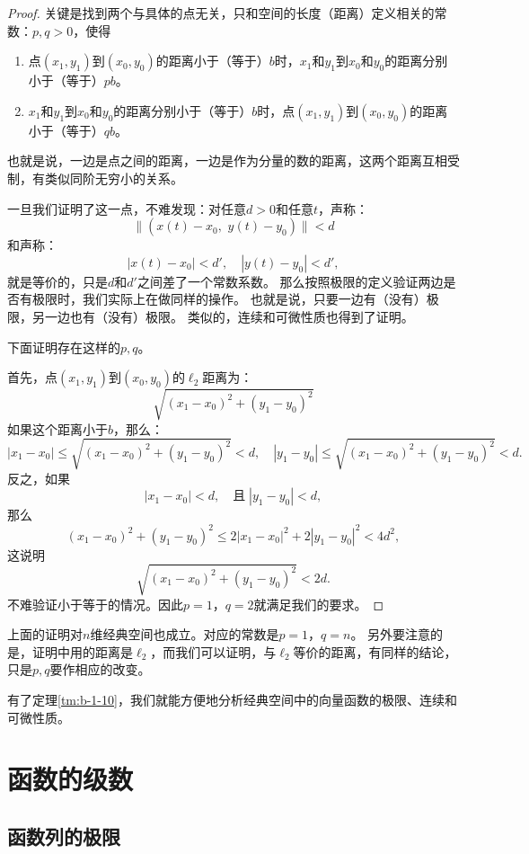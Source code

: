 \documentclass[12pt,UTF8]{ctexbook}
\begin{document}
\begin{appendix}
\begin{proof}
    关键是找到两个与具体的点无关，只和空间的长度（距离）定义相关的常数：$p,q>0$，使得
    \begin{enumerate}
        \item 点$(x_1, y_1)$到$(x_0, y_0)$的距离小于（等于）$b$时，$x_1$和$y_1$到$x_0$和$y_0$的距离分别小于（等于）$pb$。
        \item $x_1$和$y_1$到$x_0$和$y_0$的距离分别小于（等于）$b$时，点$(x_1, y_1)$到$(x_0, y_0)$的距离小于（等于）$qb$。
    \end{enumerate}
    也就是说，一边是点之间的距离，一边是作为分量的数的距离，这两个距离互相受制，有类似同阶无穷小的关系。
    
    一旦我们证明了这一点，不难发现：对任意$d>0$和任意$t$，声称：
    $$ \|(x(t) - x_0,\,\, y(t) - y_0)\| < d $$
    和声称：
    $$ |x(t) - x_0| < d' , \quad |y(t) - y_0 | < d', $$
    就是等价的，只是$d$和$d'$之间差了一个常数系数。
    那么按照极限的定义验证两边是否有极限时，我们实际上在做同样的操作。
    也就是说，只要一边有（没有）极限，另一边也有（没有）极限。
    类似的，连续和可微性质也得到了证明。

    下面证明存在这样的$p,q$。

    首先，点$(x_1, y_1)$到$(x_0, y_0)$的$\ell_2$距离为：
    $$ \sqrt{(x_1 - x_0)^2 + ( y_1 - y_0)^2} $$
    如果这个距离小于$b$，那么：
    $$ |x_1 - x_0| \leqslant \sqrt{(x_1 - x_0)^2 + ( y_1 - y_0)^2} < d, \quad |y_1 - y_0| \leqslant \sqrt{(x_1 - x_0)^2 + ( y_1 - y_0)^2} < d. $$
    反之，如果
    $$ |x_1 - x_0| < d, \quad \mbox{且}\; |y_1 - y_0| < d, $$
    那么
    $$ (x_1 - x_0)^2 + ( y_1 - y_0)^2 \leqslant 2|x_1 - x_0|^2 + 2|y_1 - y_0|^2 < 4d^2, $$
    这说明
    $$ \sqrt{(x_1 - x_0)^2 + ( y_1 - y_0)^2} < 2d. $$
    不难验证小于等于的情况。因此$p = 1$，$q = 2$就满足我们的要求。

\end{proof}

上面的证明对$n$维经典空间也成立。对应的常数是$p = 1$，$q = n$。
另外要注意的是，证明中用的距离是$\ell_2$，而我们可以证明，与$\ell_2$等价的距离，有同样的结论，只是$p,q$要作相应的改变。

有了定理\ref{tm:b-1-10}，我们就能方便地分析经典空间中的向量函数的极限、连续和可微性质。

\chapter{函数的级数}

\section{函数列的极限}


\end{appendix}
\end{document}
